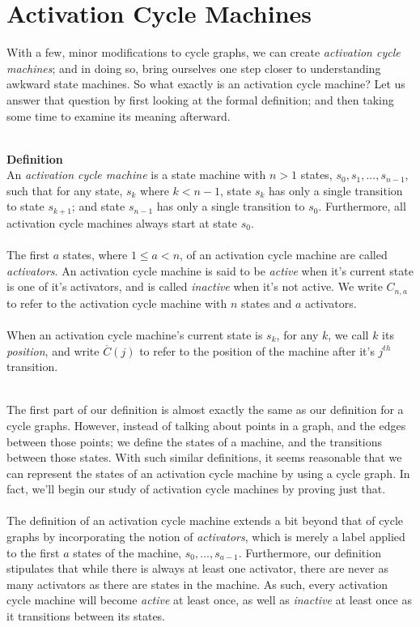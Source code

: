 \documentclass[a4paper,12pt]{article}
\begin{document}
\section{Activation Cycle Machines}
With a few, minor modifications to cycle graphs, we can create \textit{activation cycle machines}; and in doing so, bring ourselves one step closer to understanding awkward state machines. So what exactly is an activation cycle machine? Let us answer that question by first looking at the formal definition; and then taking some time to examine its meaning afterward.\\
\\
\begin{tcolorbox}
\textbf{Definition}\\
An \textit{activation cycle machine} is a state machine with $n > 1$ states, $s_0, s_1, ..., s_{n-1}$, such that for any state, $s_k$ where $k < n - 1$, state $s_k$ has only a single transition to state $s_{k+1}$; and state $s_{n-1}$ has only a single transition to $s_0$. Furthermore, all activation cycle machines always start at state $s_0$.\\
\\
The first $a$ states, where $1 \leq a < n$, of an activation cycle machine are called \textit{activators}. An activation cycle machine is said to be \textit{active} when it's current state is one of it's activators, and is called \textit{inactive} when it's not active. We write $C_{n,a}$ to refer to the activation cycle machine with $n$ states and $a$ activators.\\
\\
When an activation cycle machine's current state is $s_k$, for any $k$, we call $k$ its \textit{position}, and write $\overline{C}(j)$ to refer to the position of the machine after it's $j^{th}$ transition. 
\end{tcolorbox}
\noindent
\\
The first part of our definition is almost exactly the same as our definition for a cycle graphs. However, instead of talking about points in a graph, and the edges between those points; we define the states of a machine, and the transitions between those states. With such similar definitions, it seems reasonable that we can represent the states of an activation cycle machine by using a cycle graph. In fact, we'll begin our study of activation cycle machines by proving just that.\\
\\
The definition of an activation cycle machine extends a bit beyond that of cycle graphs by incorporating the notion of \textit{activators},  which is merely a label applied to the first $a$ states of the machine, $s_0, ..., s_{a-1}$. Furthermore, our definition stipulates that while there is always at least one activator, there are never as many activators as there are states in the machine. As such, every activation cycle machine will become \textit{active} at least once, as well as \textit{inactive} at least once as it transitions between its states.\\
\end{document}
